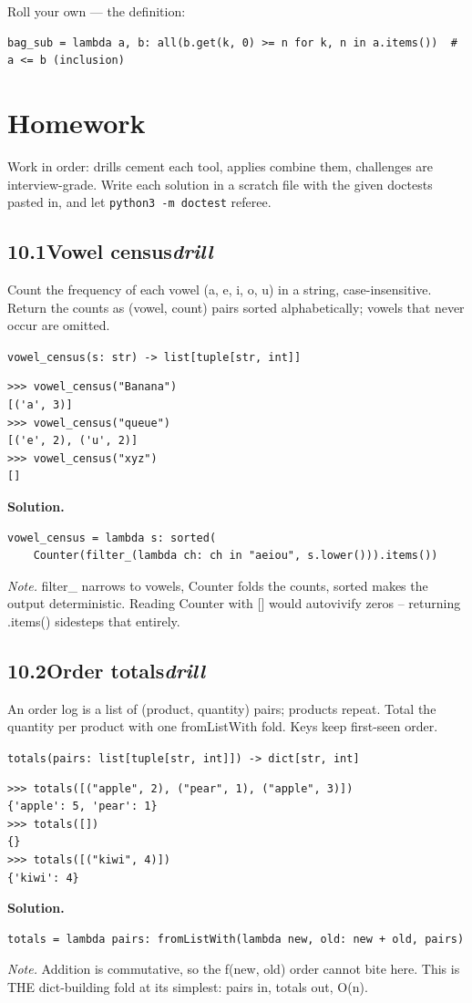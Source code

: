\documentclass[10pt,letterpaper]{book}
\begin{document}
Roll your own --- the definition:

\begin{lstlisting}[style=ex]
bag_sub = lambda a, b: all(b.get(k, 0) >= n for k, n in a.items())  # a <= b (inclusion)
\end{lstlisting}
\section{Homework}
Work in order: drills cement each tool, applies combine them,
challenges are interview-grade. Write each solution in a scratch file with
the given doctests pasted in, and let \texttt{python3 -m doctest} referee.
\subsection*{10.1\quad Vowel census\hfill\textnormal{\textit{drill}}}
Count the frequency of each vowel (a, e, i, o, u) in a string, case-insensitive. Return the counts as (vowel, count) pairs sorted alphabetically; vowels that never occur are omitted.

\noindent\texttt{vowel\_census(s: str) -> list[tuple[str, int]]}
\begin{lstlisting}[style=ex]
>>> vowel_census("Banana")
[('a', 3)]
>>> vowel_census("queue")
[('e', 2), ('u', 2)]
>>> vowel_census("xyz")
[]
\end{lstlisting}
\noindent\textbf{Solution.}
\begin{lstlisting}[style=code]
vowel_census = lambda s: sorted(
    Counter(filter_(lambda ch: ch in "aeiou", s.lower())).items())
\end{lstlisting}
\noindent\textit{Note.} filter\_ narrows to vowels, Counter folds the counts, sorted makes the output deterministic. Reading Counter with [] would autovivify zeros -- returning .items() sidesteps that entirely.

\subsection*{10.2\quad Order totals\hfill\textnormal{\textit{drill}}}
An order log is a list of (product, quantity) pairs; products repeat. Total the quantity per product with one fromListWith fold. Keys keep first-seen order.

\noindent\texttt{totals(pairs: list[tuple[str, int]]) -> dict[str, int]}
\begin{lstlisting}[style=ex]
>>> totals([("apple", 2), ("pear", 1), ("apple", 3)])
{'apple': 5, 'pear': 1}
>>> totals([])
{}
>>> totals([("kiwi", 4)])
{'kiwi': 4}
\end{lstlisting}
\noindent\textbf{Solution.}
\begin{lstlisting}[style=code]
totals = lambda pairs: fromListWith(lambda new, old: new + old, pairs)
\end{lstlisting}
\noindent\textit{Note.} Addition is commutative, so the f(new, old) order cannot bite here. This is THE dict-building fold at its simplest: pairs in, totals out, O(n).
\end{document}
